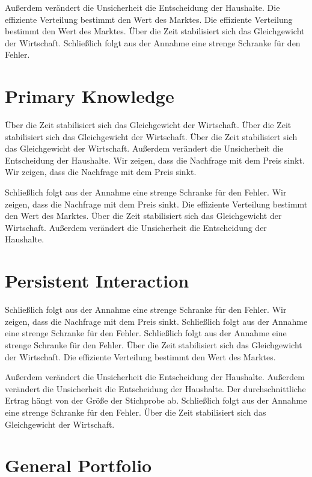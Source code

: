\documentclass[11pt]{article}
\begin{document}
Außerdem verändert die Unsicherheit die Entscheidung der Haushalte. Die effiziente Verteilung bestimmt den Wert des Marktes. Die effiziente Verteilung bestimmt den Wert des Marktes. Über die Zeit stabilisiert sich das Gleichgewicht der Wirtschaft. Schließlich folgt aus der Annahme eine strenge Schranke für den Fehler.

\section{Primary Knowledge}\label{sec:22}

Über die Zeit stabilisiert sich das Gleichgewicht der Wirtschaft. Über die Zeit stabilisiert sich das Gleichgewicht der Wirtschaft. Über die Zeit stabilisiert sich das Gleichgewicht der Wirtschaft. Außerdem verändert die Unsicherheit die Entscheidung der Haushalte. Wir zeigen, dass die Nachfrage mit dem Preis sinkt. Wir zeigen, dass die Nachfrage mit dem Preis sinkt.

Schließlich folgt aus der Annahme eine strenge Schranke für den Fehler. Wir zeigen, dass die Nachfrage mit dem Preis sinkt. Die effiziente Verteilung bestimmt den Wert des Marktes. Über die Zeit stabilisiert sich das Gleichgewicht der Wirtschaft. Außerdem verändert die Unsicherheit die Entscheidung der Haushalte.

\section{Persistent Interaction}\label{sec:23}

Schließlich folgt aus der Annahme eine strenge Schranke für den Fehler. Wir zeigen, dass die Nachfrage mit dem Preis sinkt. Schließlich folgt aus der Annahme eine strenge Schranke für den Fehler. Schließlich folgt aus der Annahme eine strenge Schranke für den Fehler. Über die Zeit stabilisiert sich das Gleichgewicht der Wirtschaft. Die effiziente Verteilung bestimmt den Wert des Marktes.

Außerdem verändert die Unsicherheit die Entscheidung der Haushalte. Außerdem verändert die Unsicherheit die Entscheidung der Haushalte. Der durchschnittliche Ertrag hängt von der Größe der Stichprobe ab. Schließlich folgt aus der Annahme eine strenge Schranke für den Fehler. Über die Zeit stabilisiert sich das Gleichgewicht der Wirtschaft.

\section{General Portfolio}\label{sec:24}
\end{document}
